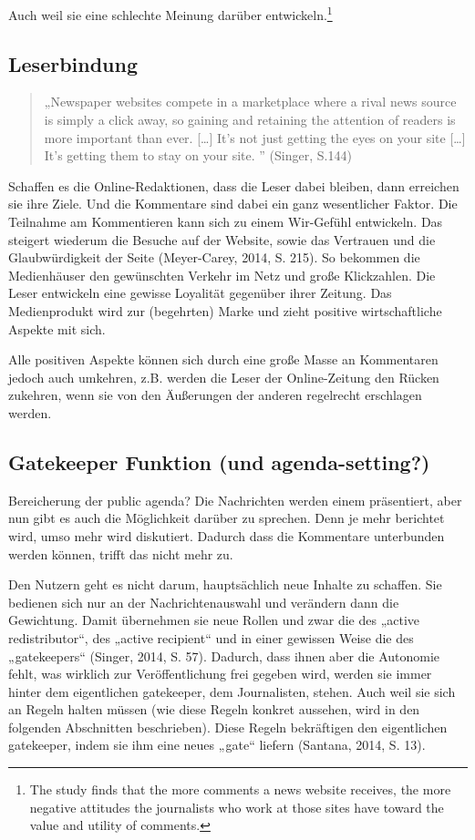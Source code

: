 Auch weil sie eine schlechte Meinung darüber entwickeln.\footnote{The study
finds that the more comments a news website receives, the more negative
attitudes the journalists who work at those sites have toward the value and
utility of comments.}


\subsection{Leserbindung}

\begin{quote}
„Newspaper websites compete in a marketplace where a rival news source is simply
a click away, so gaining and retaining the attention of readers is more
important than ever. [\ldots] It’s not just getting the eyes on your site
[\ldots] It’s getting them to stay on your site. ” (Singer, S.144)
\end{quote}

Schaffen es die Online-Redaktionen, dass die Leser dabei bleiben, dann erreichen
sie ihre Ziele. Und die Kommentare sind dabei ein ganz wesentlicher Faktor. Die
Teilnahme am Kommentieren kann sich zu einem Wir-Gefühl entwickeln. Das steigert
wiederum die Besuche auf der Website, sowie das Vertrauen und die
Glaubwürdigkeit der Seite (Meyer-Carey, 2014, S. 215). So bekommen die
Medienhäuser den gewünschten Verkehr im Netz und große Klickzahlen. Die Leser
entwickeln eine gewisse Loyalität gegenüber ihrer Zeitung. Das Medienprodukt
wird zur (begehrten) Marke und zieht positive wirtschaftliche Aspekte mit sich.

Alle positiven Aspekte können sich durch eine große Masse an Kommentaren jedoch
auch umkehren, z.B. werden die Leser der Online-Zeitung den Rücken zukehren,
wenn sie von den Äußerungen der anderen regelrecht erschlagen werden.


\subsection{Gatekeeper Funktion (und agenda-setting?)}

Bereicherung der public agenda? Die Nachrichten werden einem präsentiert, aber
nun gibt es auch die Möglichkeit darüber zu sprechen. Denn je mehr berichtet
wird, umso mehr wird diskutiert. Dadurch dass die Kommentare unterbunden werden
können, trifft das nicht mehr zu.

Den Nutzern geht es nicht darum, hauptsächlich neue Inhalte zu schaffen. Sie
bedienen sich nur an der Nachrichtenauswahl und verändern dann die Gewichtung.
Damit übernehmen sie neue Rollen und zwar die des „active redistributor“, des
„active recipient“ und in einer gewissen Weise die des „gatekeepers“ (Singer,
2014, S. 57). Dadurch, dass ihnen aber die Autonomie fehlt, was wirklich zur
Veröffentlichung frei gegeben wird, werden sie immer hinter dem eigentlichen
gatekeeper, dem Journalisten, stehen. Auch weil sie sich an Regeln halten müssen
(wie diese Regeln konkret aussehen, wird in den folgenden Abschnitten
beschrieben). Diese Regeln bekräftigen den eigentlichen gatekeeper, indem sie
ihm eine neues „gate“ liefern (Santana, 2014, S. 13).

